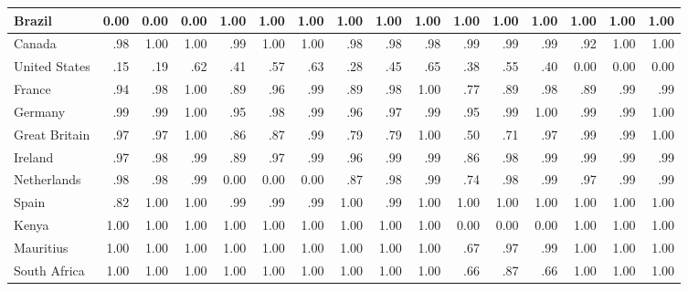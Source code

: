 \begin{table*}[h]
{\begin{tabular}{P{32mm}|d{3.2}d{3.2}d{3.2}|d{3.2}d{3.2}d{3.2}|d{3.2}d{3.2}d{3.2}|d{3.2}d{3.2}d{3.2}|d{3.2}d{3.2}d{3.2}}
Brazil               &0.00  &0.00   &0.00     &1.00 &1.00 &1.00   &1.00  &1.00  &1.00   &1.00 &1.00  &1.00  &1.00 &1.00 &1.00  \\ \midrule
Canada               &.98  &1.00   &1.00     &.99 &1.00 &1.00   &.98  &.98  &.98  &.99 &.99  &.99  &.92 &1.00  &1.00  \\
United States        &.15  &.19   &.62     &.41  &.57 &.63   &.28  &.45  &.65  &.38 &.55  &.40  &0.00  &0.00 &0.00  \\ \midrule
France               &.94   &.98  &1.00     &.89 &.96 &.99   &.89  &.98  &1.00  &.77 &.89  &.98  &.89 &.99 &.99  \\
Germany              &.99  &.99   &1.00     &.95 &.98 &.99   &.96  &.97  &.99  &.95 &.99  &1.00  &.99 &.99 &1.00  \\
Great Britain        &.97  &.97   &1.00     &.86 &.87 &.99   &.79  &.79  &1.00  &.50 &.71  &.97  &.99 &.99 &1.00  \\
Ireland              &.97   &.98  &.99     &.89 &.97 &.99   &.96 &.99   &.99  &.86 &.98  &.99  &.99 &.99 &.99  \\
Netherlands          &.98  &.98   &.99     &0.00 &0.00 &0.00   &.87  &.98  &.99  &.74  &.98 &.99  &.97 &.99 &.99  \\
Spain                &.82  &1.00   &1.00     &.99 &.99 &.99   &1.00  &.99  &1.00  &1.00  &1.00 &1.00  &1.00 &1.00  &1.00  \\ \midrule
Kenya                &1.00  &1.00   &1.00     &1.00 &1.00 &1.00   &1.00  &1.00  &1.00  &0.00 &0.00  &0.00  &1.00 &1.00  &1.00  \\
Mauritius            &1.00  &1.00   &1.00     &1.00 &1.00 &1.00   &1.00  &1.00  &1.00  &.67 &.97  &.99  &1.00 &1.00 &1.00  \\
South Africa         &1.00  &1.00   &1.00     &1.00 &1.00 &1.00   &1.00 &1.00   &1.00  &.66 &.87  &.66  &1.00 &1.00 &1.00  \\ \midrule

\end{tabular}}
\end{table*}
